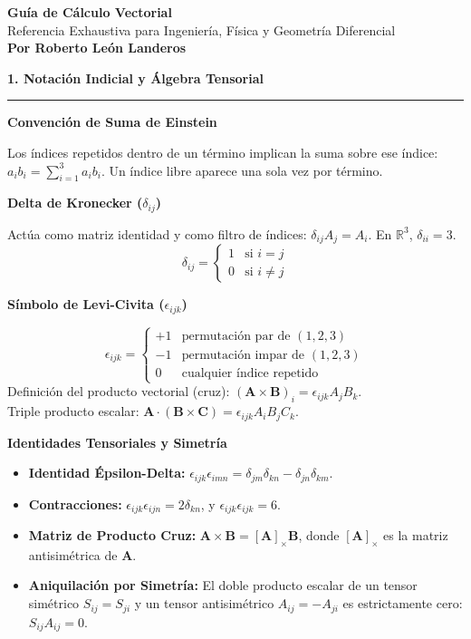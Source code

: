 \documentclass[10pt, landscape, twocolumn]{article}
\newcommand{\cheatsheetsection}[1]{
    \vspace{0.8em}
    {\color{themeblue}\large\bfseries #1} \par
    \vspace{-0.4em}
    {\color{themeblue}\rule{\linewidth}{1pt}} \par
    \vspace{0.3em}
}
\newcommand{\cheatsheetsubsection}[1]{
    \vspace{0.5em}
    {\color{themeblue}\normalsize\bfseries #1} \par
    \vspace{0.2em}
}
\begin{document}
\begin{center}
    \vspace{-1em}
    {\color{themeblue}\huge\bfseries Guía de Cálculo Vectorial}\\[0.3em]
    {\color{themegray}\small Referencia Exhaustiva para Ingeniería, Física y Geometría Diferencial}\\[0.4em]
    {\color{themegray}\footnotesize \textbf{Por Roberto León Landeros}}
\end{center}
\vspace{-1em}

\cheatsheetsection{1. Notación Indicial y Álgebra Tensorial}

\cheatsheetsubsection{Convención de Suma de Einstein}
Los índices repetidos dentro de un término implican la suma sobre ese índice: $a_i b_i = \sum_{i=1}^3 a_i b_i$. Un índice libre aparece una sola vez por término.

\cheatsheetsubsection{Delta de Kronecker ($\delta_{ij}$)}
Actúa como matriz identidad y como filtro de índices: $\delta_{ij} A_j = A_i$. En $\mathbb{R}^3$, $\delta_{ii} = 3$.
\[
\delta_{ij} = \begin{cases} 
1 & \text{si } i = j \\ 
0 & \text{si } i \neq j 
\end{cases}
\]

\cheatsheetsubsection{Símbolo de Levi-Civita ($\epsilon_{ijk}$)}
\[
\epsilon_{ijk} = \begin{cases} 
+1 & \text{permutación par de } (1,2,3) \\ 
-1 & \text{permutación impar de } (1,2,3) \\ 
0 & \text{cualquier índice repetido} 
\end{cases}
\]
Definición del producto vectorial (cruz): $(\mathbf{A} \times \mathbf{B})_i = \epsilon_{ijk} A_j B_k$. \\
Triple producto escalar: $\mathbf{A} \cdot (\mathbf{B} \times \mathbf{C}) = \epsilon_{ijk} A_i B_j C_k$.

\cheatsheetsubsection{Identidades Tensoriales y Simetría}
\begin{itemize}[leftmargin=*, nosep]
    \item \textbf{Identidad Épsilon-Delta:} $\epsilon_{ijk}\epsilon_{imn} = \delta_{jm}\delta_{kn} - \delta_{jn}\delta_{km}$.
    \item \textbf{Contracciones:} $\epsilon_{ijk}\epsilon_{ijn} = 2\delta_{kn}$, y $\epsilon_{ijk}\epsilon_{ijk} = 6$.
    \item \textbf{Matriz de Producto Cruz:} $\mathbf{A} \times \mathbf{B} = [\mathbf{A}]_\times \mathbf{B}$, donde $[\mathbf{A}]_\times$ es la matriz antisimétrica de $\mathbf{A}$.
    \item \textbf{Aniquilación por Simetría:} El doble producto escalar de un tensor simétrico $S_{ij} = S_{ji}$ y un tensor antisimétrico $A_{ij} = -A_{ji}$ es estrictamente cero: $S_{ij}A_{ij} = 0$.
\end{itemize}
\end{document}
